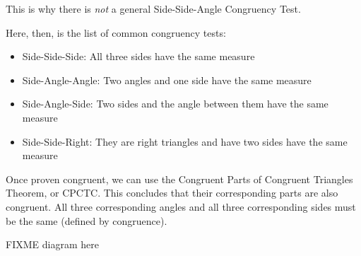 
This is why there is \emph{not} a general Side-Side-Angle Congruency Test.

Here, then, is the list of common congruency tests:
\begin{itemize}
\item Side-Side-Side: All three sides have the same measure
\item Side-Angle-Angle: Two angles and one side have the same measure
\item Side-Angle-Side: Two sides and the angle between them have the same measure
\item Side-Side-Right: They are right triangles and have two sides have the same measure
\end{itemize}

Once proven congruent, we can use the Congruent Parts of Congruent Triangles Theorem, or CPCTC. This concludes that their corresponding parts are also congruent. All three corresponding angles and all three corresponding sides must be the same (defined by congruence).

FIXME diagram here


